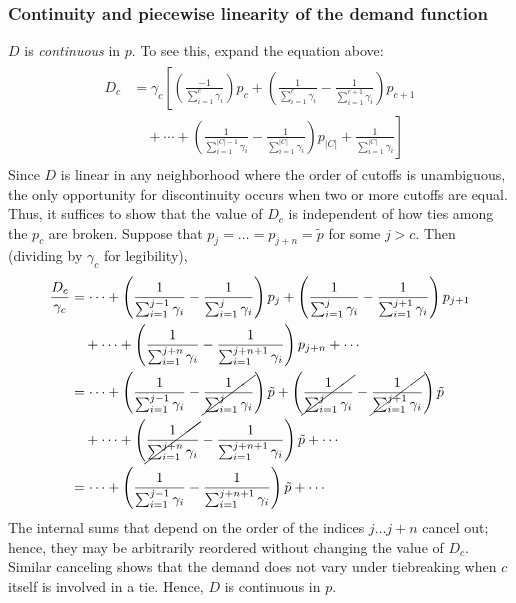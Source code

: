 \documentclass[12pt]{article}
\theoremstyle{definition}
\begin{document}
\subsubsection{Continuity and piecewise linearity of the demand function}
$D$ is \emph{continuous} in $p$. To see this, expand the equation above:
\begin{gather}
\begin{aligned}D_c &= \gamma_c \left[
\left( \frac{-1}{\sum_{i=1}^c \gamma_i}\right) p_c
+ \left(\frac{1}{\sum_{i=1}^{c} \gamma_i} - \frac{1}{\sum_{i=1}^{c+1} \gamma_i} \right) p_{c+1}
\right. \\ &\left.
\quad + \cdots
+ \left(\frac{1}{\sum_{i=1}^{|C|-1} \gamma_i} - \frac{1}{\sum_{i=1}^{|C|} \gamma_i}\right) p_{|C|}
+ \frac{1}{\sum_{i=1}^{|C|} \gamma_i}
\right]
\end{aligned}
\end{gather}
Since $D$ is linear in any neighborhood where the order of cutoffs is unambiguous, the only opportunity for discontinuity occurs when two or more cutoffs are equal. Thus, it suffices to show that the value of $D_c$ is independent of how ties among the $p_c$ are broken. Suppose that $p_j = \dots = p_{j+n} = \tilde p$ for some $j > c$. Then (dividing by $\gamma_c$ for legibility),
\begin{gather}
\begin{aligned}
\frac{D_c}{\gamma_c} &= \cdots
+ \left(\frac{1}{\sum_{i=1}^{j-1} \gamma_i} - \frac{1}{\sum_{i=1}^{j} \gamma_i} \right) p_{j}
+ \left(\frac{1}{\sum_{i=1}^{j} \gamma_i} - \frac{1}{\sum_{i=1}^{j+1} \gamma_i} \right) p_{j+1}
 \\ &\quad + \cdots
+ \left(\frac{1}{\sum_{i=1}^{j+n} \gamma_i} - \frac{1}{\sum_{i=1}^{j+n+1} \gamma_i}\right) p_{j+n}
+ \cdots \\
&= \cdots
+ \left(\frac{1}{\sum_{i=1}^{j-1} \gamma_i} - \cancel{\frac{1}{\sum_{i=1}^{j} \gamma_i}} \right) \tilde p
+ \left(\cancel{\frac{1}{\sum_{i=1}^{j} \gamma_i}} - \cancel{\frac{1}{\sum_{i=1}^{j+1} \gamma_i}} \right) \tilde p
\\ &\quad  + \cdots
+ \left(\cancel{\frac{1}{\sum_{i=1}^{j+n} \gamma_i}} - \frac{1}{\sum_{i=1}^{j+n+1} \gamma_i}\right) \tilde p
+ \cdots \\
&= \cdots
+ \left(\frac{1}{\sum_{i=1}^{j-1} \gamma_i} - \frac{1}{\sum_{i=1}^{j+n+1} \gamma_i}\right) \tilde p
+ \cdots
\end{aligned}
\end{gather}
The internal sums that depend on the order of the indices $j \dots j+n$ cancel out; hence, they may be arbitrarily reordered without changing the value of $D_c$. Similar canceling shows that the demand does not vary under tiebreaking when $c$ itself is involved in a tie. Hence, $D$ is continuous in $p$. 
\end{document}
